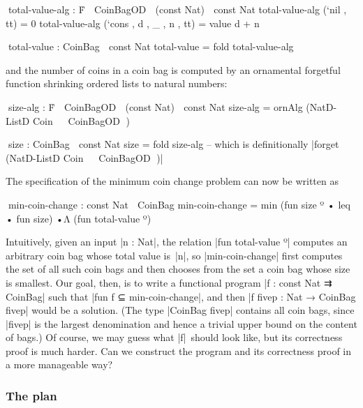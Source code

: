 \begin{code}
^^^total-value-alg : Ḟ ⌊ CoinBagOD ⌋ (const Nat) ⇉ const Nat
total-value-alg (`nil   ,              tt) = 0
total-value-alg (`cons  , d , _ , n ,  tt) = value d + n

^^^total-value : CoinBag ⇉ const Nat
total-value = fold total-value-alg
\end{code}
and the number of coins in a coin bag is computed by an ornamental forgetful function shrinking ordered lists to natural numbers:
\begin{code}
^^^size-alg : Ḟ ⌊ CoinBagOD ⌋ (const Nat) ⇉ const Nat
size-alg = ornAlg (NatD-ListD Coin ⊙ ⌈ CoinBagOD ⌉)

^^^size : CoinBag ⇉ const Nat
size = fold size-alg
-- which is definitionally |forget (NatD-ListD Coin ⊙ ⌈ CoinBagOD ⌉)|
\end{code}
The specification of the minimum coin change problem can now be written as
\begin{code}
^^^min-coin-change : const Nat ↝ CoinBag
min-coin-change = min (fun size º • leq • fun size) •Λ (fun total-value º)
\end{code}
Intuitively, given an input |n : Nat|, the relation |fun total-value º| computes an arbitrary coin bag whose total value is~|n|, so |min-coin-change| first computes the set of all such coin bags and then chooses from the set a coin bag whose size is smallest.
Our goal, then, is to write a functional program |f : const Nat ⇉ CoinBag| such that |fun f ⊆ min-coin-change|, and then |f {fivep} : Nat → CoinBag fivep| would be a solution.
(The type |CoinBag fivep| contains all coin bags, since |fivep| is the largest denomination and hence a trivial upper bound on the content of bags.)
Of course, we may guess what |f|~should look like, but its correctness proof is much harder.
Can we construct the program and its correctness proof in a more manageable way?

\subsubsection{The plan}

